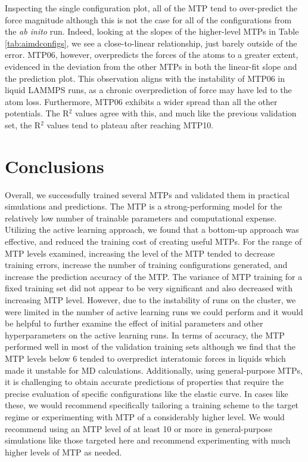 \documentclass[9pt,twocolumn,twoside]{opticajnl}
\begin{document}
Inspecting the single configuration plot, all of the MTP tend to over-predict the force magnitude although this is not the case for all of the configurations from the \textit{ab inito} run. Indeed, looking at the slopes of the higher-level MTPs in Table \ref{tab:aimdconfigs}, we see a close-to-linear relationship, just barely outside of the error.  MTP06, however, overpredicts the forces of the atoms to a greater extent, evidenced in the deviation from the other MTPs in both the linear-fit slope and the prediction plot. This observation aligns with the instability of MTP06 in liquid LAMMPS runs, as a chronic overprediction of force may have led to the atom loss. Furthermore, MTP06 exhibits a wider spread than all the other potentials. The R$^2$ values agree with this, and much like the previous validation set, the R$^2$ values tend to plateau after reaching MTP10.

\section{Conclusions}
Overall, we successfully trained several MTPs and validated them in practical simulations and predictions. The MTP is a strong-performing model for the relatively low number of trainable parameters and computational expense. Utilizing the active learning approach, we found that a bottom-up approach was effective, and reduced the training cost of creating useful MTPs. For the range of MTP levels examined, increasing the level of the MTP tended to decrease training errors, increase the number of training configurations generated, and increase the prediction accuracy of the MTP. The variance of MTP training for a fixed training set did not appear to be very significant and also decreased with increasing MTP level. However, due to the instability of runs on the cluster, we were limited in the number of active learning runs we could perform and it would be helpful to further examine the effect of initial parameters and other hyperparameters on the active learning runs. In terms of accuracy, the MTP performed well in most of the validation training sets although we find that the MTP levels below 6 tended to overpredict interatomic forces in liquids which made it unstable for MD calculations. Additionally, using general-purpose MTPs, it is challenging to obtain accurate predictions of properties that require the precise evaluation of specific configurations like the elastic curve. In cases like these, we would recommend specifically tailoring a training scheme to the target regime or experimenting with MTP of a considerably higher level. We would recommend using an MTP level of at least 10 or more in general-purpose simulations like those targeted here and recommend experimenting with much higher levels of MTP as needed. 
\end{document}
